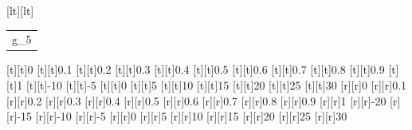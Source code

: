 \begin{psfrags}
[lt][lt]{\color[rgb]{0,0,0}\setlength{\tabcolsep}{0pt}\begin{tabular}{l}g_5\end{tabular}}%
%
[t][t]{0}%
[t][t]{0.1}%
[t][t]{0.2}%
[t][t]{0.3}%
[t][t]{0.4}%
[t][t]{0.5}%
[t][t]{0.6}%
[t][t]{0.7}%
[t][t]{0.8}%
[t][t]{0.9}%
[t][t]{1}%
[t][t]{-10}%
[t][t]{-5}%
[t][t]{0}%
[t][t]{5}%
[t][t]{10}%
[t][t]{15}%
[t][t]{20}%
[t][t]{25}%
[t][t]{30}%
%
[r][r]{0}%
[r][r]{0.1}%
[r][r]{0.2}%
[r][r]{0.3}%
[r][r]{0.4}%
[r][r]{0.5}%
[r][r]{0.6}%
[r][r]{0.7}%
[r][r]{0.8}%
[r][r]{0.9}%
[r][r]{1}%
[r][r]{-20}%
[r][r]{-15}%
[r][r]{-10}%
[r][r]{-5}%
[r][r]{0}%
[r][r]{5}%
[r][r]{10}%
[r][r]{15}%
[r][r]{20}%
[r][r]{25}%
[r][r]{30}%
%
%
\end{psfrags}%
%
